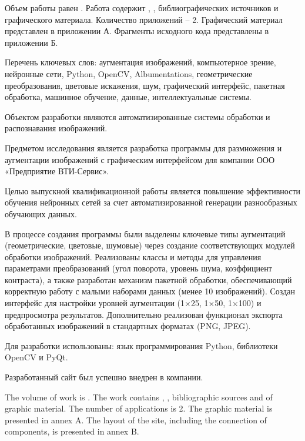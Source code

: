 
Объем работы равен . Работа содержит , ,  библиографических источников и  графического материала. Количество приложений – 2. Графический материал представлен в приложении А. Фрагменты исходного кода представлены в приложении Б.

Перечень ключевых слов: аугментация изображений, компьютерное зрение, нейронные сети, Python, OpenCV, Albumentations, геометрические преобразования, цветовые искажения, шум, графический интерфейс, пакетная обработка, машинное обучение, данные, интеллектуальные системы.

Объектом разработки являются автоматизированные системы обработки и распознавания изображений.

Предметом исследования является разработка программы для размножения и аугментации изображений с графическим интерфейсом для компании ООО «Предприятие ВТИ-Сервис». 

Целью выпускной квалификационной работы является повышение эффективности обучения нейронных сетей за счет автоматизированной генерации разнообразных обучающих данных.

В процессе создания программы были выделены ключевые типы аугментаций (геометрические, цветовые, шумовые) через создание соответствующих модулей обработки изображений. Реализованы классы и методы для управления параметрами преобразований (угол поворота, уровень шума, коэффициент контраста), а также разработан механизм пакетной обработки, обеспечивающий корректную работу с малыми наборами данных (менее 10 изображений). Создан интерфейс для настройки уровней аугментации (1×25, 1×50, 1×100) и предпросмотра результатов. Дополнительно реализован функционал экспорта обработанных изображений в стандартных форматах (PNG, JPEG).

Для разработки использованы: язык программирования Python, библиотеки OpenCV и PyQt.

Разработанный сайт был успешно внедрен в компании.

  
The volume of work is . The work contains , ,  bibliographic sources and  of graphic material. The number of applications is 2. The graphic material is presented in annex A. The layout of the site, including the connection of components, is presented in annex B.

